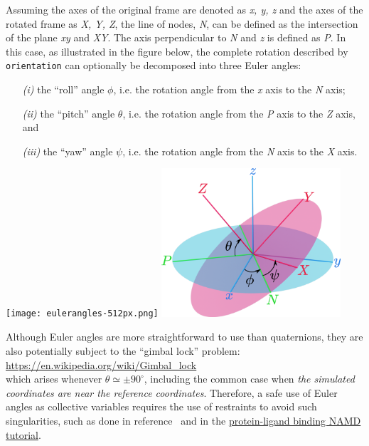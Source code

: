 Assuming the axes of the original frame are denoted as \textit{x, y, z} and the 
axes of the rotated frame as \textit{X, Y, Z}, the line of nodes, \textit{N}, 
can be defined as the intersection of the plane \textit{xy} and \textit{XY}. 
The axis perpendicular to \textit{N} and \textit{z} is defined as \textit{P}. 
In this case, as illustrated in the figure below, the complete 
rotation described by \texttt{orientation} can optionally be decomposed into 
three Euler angles:
\begin{itemize}
\item[\emph{(i)}] the ``roll'' angle $\phi$, i.e.{} the rotation angle from the \textit{x} axis to the \textit{N} axis;
\item[\emph{(ii)}] the ``pitch'' angle $\theta$, i.e.{} the rotation angle from 
the \textit{P} axis to the \textit{Z} axis, and
\item[\emph{(iii)}] the ``yaw'' angle $\psi$, i.e.{} the rotation angle from the \textit{N} axis to the \textit{X} axis.
\end{itemize}

\begin{center}
\ifdefined\HCode
\texttt{[image: eulerangles-512px.png]}
\else
\includegraphics[width=0.5\textwidth]{eulerangles.pdf}
\fi
\end{center}

Although Euler angles are more straightforward to use than quaternions, they are also potentially subject to the ``gimbal lock'' problem:\\
\url{https://en.wikipedia.org/wiki/Gimbal_lock}\\
\noindent{}which arises whenever $\theta \simeq \pm 90^\circ$, including the common case when \emph{the simulated coordinates are near the reference coordinates}.
Therefore, a safe use of Euler angles as collective variables requires the use of restraints to avoid such singularities, such as done in reference~\cite{Fu2017} and in the \href{http://www.ks.uiuc.edu/Training/Tutorials/namd/PLB/tutorial-protein-ligand.pdf}{protein-ligand binding NAMD tutorial}.

